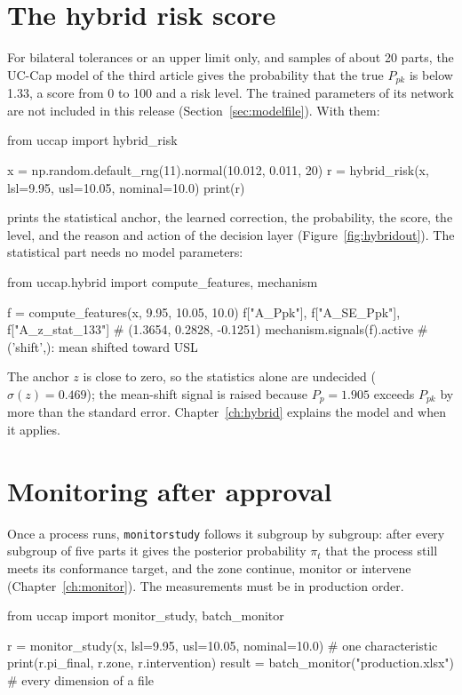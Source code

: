 \documentclass[a4paper,11pt,oneside,openany,parskip=half-,headings=standardclasses,toc=flat,numbers=noenddot]{scrbook}
\newcommand{\code}[1]{\texttt{\begingroup\def\_{\textunderscore\allowbreak}#1\endgroup}}
\newcommand{\secref}[1]{Section~\ref{#1}}
\newcommand{\chapref}[1]{Chapter~\ref{#1}}
\newcommand{\figref}[1]{Figure~\ref{#1}}
\begin{document}
\section{The hybrid risk score}

For bilateral tolerances or an upper limit only, and samples of about 20 parts, the UC-Cap model of the third article gives
the probability that the true $P_{pk}$ is below 1.33, a score from 0 to 100 and a risk level. The trained parameters
of its network are not included in this release
(\secref{sec:modelfile}). With them:

\begin{pycode}
from uccap import hybrid_risk

x = np.random.default_rng(11).normal(10.012, 0.011, 20)
r = hybrid_risk(x, lsl=9.95, usl=10.05, nominal=10.0)
print(r)
\end{pycode}

prints the statistical anchor, the learned correction, the probability, the score, the level, and the reason and
action of the decision layer (\figref{fig:hybridout}). The statistical part needs no model parameters:

\begin{pycode}
from uccap.hybrid import compute_features, mechanism

f = compute_features(x, 9.95, 10.05, 10.0)
f["A_Ppk"], f["A_SE_Ppk"], f["A_z_stat_133"]   # (1.3654, 0.2828, -0.1251)
mechanism.signals(f).active                    # ('shift',): mean shifted toward USL
\end{pycode}

The anchor $z$ is close to zero, so the statistics alone are undecided ($\sigma(z) = 0.469$); the mean-shift
signal is raised because $P_p = 1.905$ exceeds $P_{pk}$ by more than the standard error.
\chapref{ch:hybrid} explains the model and when it applies.

\section{Monitoring after approval}

Once a process runs, \code{monitor\_study} follows it subgroup by subgroup: after every subgroup of five parts it
gives the posterior probability $\pi_t$ that the process still meets its conformance target, and the zone continue,
monitor or intervene (\chapref{ch:monitor}). The measurements must be in production order.

\begin{pycode}
from uccap import monitor_study, batch_monitor

r = monitor_study(x, lsl=9.95, usl=10.05, nominal=10.0)   # one characteristic
print(r.pi_final, r.zone, r.intervention)
result = batch_monitor("production.xlsx")                  # every dimension of a file
\end{pycode}
\end{document}
